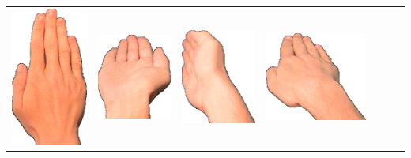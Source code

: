 \documentclass{article}
\begin{document}
\begin{center}
\begin{tabular}{r*{6}{c}}
\includegraphics[scale=0.1]{images/05-10-3.jpg}&
\includegraphics[scale=0.1]{images/05-10-4.jpg}&
\includegraphics[scale=0.1]{images/05-10-5.jpg}&
\includegraphics[scale=0.1]{images/05-10-6.jpg}\\

\end{tabular}
\end{center}
\end{document}
